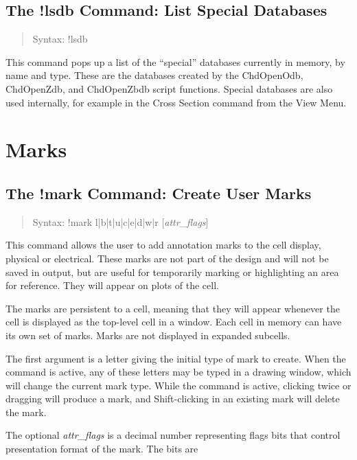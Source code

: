 \subsection{The {\cb !lsdb} Command: List Special Databases}
\begin{quote}
Syntax: {\vt !lsdb}
\end{quote}
This command pops up a list of the ``special'' databases currently in
memory, by name and type.  These are the databases created by the {\vt
ChdOpenOdb}, {\vt ChdOpenZdb}, and {\vt ChdOpenZbdb} script functions. 
Special databases are also used internally, for example in the {\cb
Cross Section} command from the {\cb View Menu}.


\section{Marks}

\subsection{The {\cb !mark} Command: Create User Marks}
\begin{quote}
Syntax: {\vt !mark l|b|t|u|c|e|d|w|r  [{\it attr\_flags\/}]}
\end{quote}
This command allows the user to add annotation marks to the cell
display, physical or electrical.  These marks are not part of the
design and will not be saved in output, but are useful for temporarily
marking or highlighting an area for reference.  They will appear on
plots of the cell.

The marks are persistent to a cell, meaning that they will appear
whenever the cell is displayed as the top-level cell in a window. 
Each cell in memory can have its own set of marks.  Marks are not
displayed in expanded subcells.

The first argument is a letter giving the initial type of mark to
create.  When the command is active, any of these letters may be typed
in a drawing window, which will change the current mark type.  While
the command is active, clicking twice or dragging will produce a mark,
and Shift-clicking in an existing mark will delete the mark.

The optional {\it attr\_flags} is a decimal number representing flags
bits that control presentation format of the mark.  The bits are

